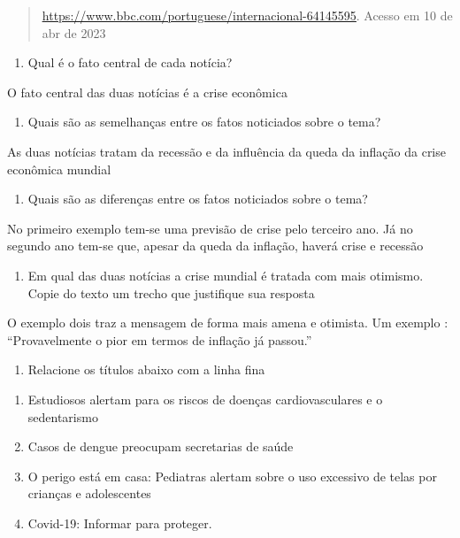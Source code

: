 \begin{quote}
\href{https://www.bbc.com/portuguese/internacional-64145595}{\uline{https://www.bbc.com/portuguese/internacional-64145595}}.
Acesso em 10 de abr de 2023
\end{quote}

\begin{enumerate}
\def\labelenumi{\arabic{enumi})}
\tightlist
\item
  Qual é o fato central de cada notícia?
\end{enumerate}

O fato central das duas notícias é a crise econômica

\begin{enumerate}
\def\labelenumi{\arabic{enumi})}
\setcounter{enumi}{1}
\tightlist
\item
  Quais são as semelhanças entre os fatos noticiados sobre o tema?
\end{enumerate}

As duas notícias tratam da recessão e da influência da queda da inflação
da crise econômica mundial

\begin{enumerate}
\def\labelenumi{\arabic{enumi})}
\setcounter{enumi}{2}
\tightlist
\item
  Quais são as diferenças entre os fatos noticiados sobre o tema?
\end{enumerate}

No primeiro exemplo tem-se uma previsão de crise pelo terceiro ano. Já
no segundo ano tem-se que, apesar da queda da inflação, haverá crise e
recessão

\begin{enumerate}
\def\labelenumi{\arabic{enumi})}
\setcounter{enumi}{3}
\tightlist
\item
  Em qual das duas notícias a crise mundial é tratada com mais otimismo.
  Copie do texto um trecho que justifique sua resposta
\end{enumerate}

O exemplo dois traz a mensagem de forma mais amena e otimista. Um
exemplo : ``Provavelmente o pior em termos de inflação já passou.''

\begin{enumerate}
\def\labelenumi{\arabic{enumi})}
\setcounter{enumi}{4}
\tightlist
\item
  Relacione os títulos abaixo com a linha fina
\end{enumerate}

\begin{enumerate}
\def\labelenumi{(\arabic{enumi})}
\item
  Estudiosos alertam para os riscos de doenças cardiovasculares e o
  sedentarismo
\item
  Casos de dengue preocupam secretarias de saúde
\item
  O perigo está em casa: Pediatras alertam sobre o uso excessivo de
  telas por crianças e adolescentes
\item
  Covid-19: Informar para proteger.
\end{enumerate}

